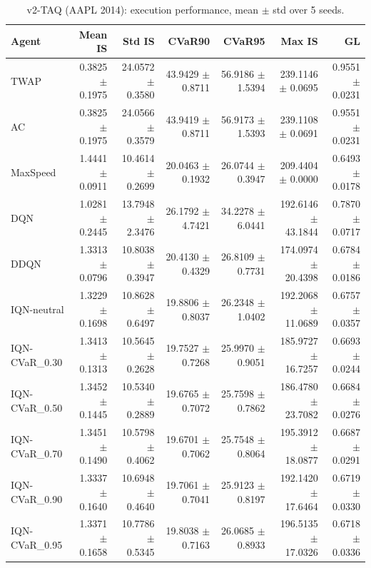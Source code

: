 \begin{table}[H]
    \centering
    \caption{v2-TAQ (AAPL 2014): execution performance, mean $\pm$ std over 5 seeds.}
    \label{tab:v2_taq_aggregate}
    \begin{tabular}{@{}lrrrrrr@{}}
        \toprule
        Agent & Mean IS & Std IS & CVaR90 & CVaR95 & Max IS & GL \\
        \midrule
        TWAP & 0.3825 $\pm$ 0.1975 & 24.0572 $\pm$ 0.3580 & 43.9429 $\pm$ 0.8711 & 56.9186 $\pm$ 1.5394 & 239.1146 $\pm$ 0.0695 & 0.9551 $\pm$ 0.0231 \\
        AC & 0.3825 $\pm$ 0.1975 & 24.0566 $\pm$ 0.3579 & 43.9419 $\pm$ 0.8711 & 56.9173 $\pm$ 1.5393 & 239.1108 $\pm$ 0.0691 & 0.9551 $\pm$ 0.0231 \\
        MaxSpeed & 1.4441 $\pm$ 0.0911 & 10.4614 $\pm$ 0.2699 & 20.0463 $\pm$ 0.1932 & 26.0744 $\pm$ 0.3947 & 209.4404 $\pm$ 0.0000 & 0.6493 $\pm$ 0.0178 \\
        DQN & 1.0281 $\pm$ 0.2445 & 13.7948 $\pm$ 2.3476 & 26.1792 $\pm$ 4.7421 & 34.2278 $\pm$ 6.0441 & 192.6146 $\pm$ 43.1844 & 0.7870 $\pm$ 0.0717 \\
        DDQN & 1.3313 $\pm$ 0.0796 & 10.8038 $\pm$ 0.3947 & 20.4130 $\pm$ 0.4329 & 26.8109 $\pm$ 0.7731 & 174.0974 $\pm$ 20.4398 & 0.6784 $\pm$ 0.0186 \\
        IQN-neutral & 1.3229 $\pm$ 0.1698 & 10.8628 $\pm$ 0.6497 & 19.8806 $\pm$ 0.8037 & 26.2348 $\pm$ 1.0402 & 192.2068 $\pm$ 11.0689 & 0.6757 $\pm$ 0.0357 \\
        IQN-CVaR\_0.30 & 1.3413 $\pm$ 0.1313 & 10.5645 $\pm$ 0.2628 & 19.7527 $\pm$ 0.7268 & 25.9970 $\pm$ 0.9051 & 185.9727 $\pm$ 16.7257 & 0.6693 $\pm$ 0.0244 \\
        IQN-CVaR\_0.50 & 1.3452 $\pm$ 0.1445 & 10.5340 $\pm$ 0.2889 & 19.6765 $\pm$ 0.7072 & 25.7598 $\pm$ 0.7862 & 186.4780 $\pm$ 23.7082 & 0.6684 $\pm$ 0.0276 \\
        IQN-CVaR\_0.70 & 1.3451 $\pm$ 0.1490 & 10.5798 $\pm$ 0.4062 & 19.6701 $\pm$ 0.7062 & 25.7548 $\pm$ 0.8064 & 195.3912 $\pm$ 18.0877 & 0.6687 $\pm$ 0.0291 \\
        IQN-CVaR\_0.90 & 1.3337 $\pm$ 0.1640 & 10.6948 $\pm$ 0.4640 & 19.7061 $\pm$ 0.7041 & 25.9123 $\pm$ 0.8197 & 192.1420 $\pm$ 17.6464 & 0.6719 $\pm$ 0.0330 \\
        IQN-CVaR\_0.95 & 1.3371 $\pm$ 0.1658 & 10.7786 $\pm$ 0.5345 & 19.8038 $\pm$ 0.7163 & 26.0685 $\pm$ 0.8933 & 196.5135 $\pm$ 17.0326 & 0.6718 $\pm$ 0.0336 \\
        \bottomrule
    \end{tabular}
\end{table}
